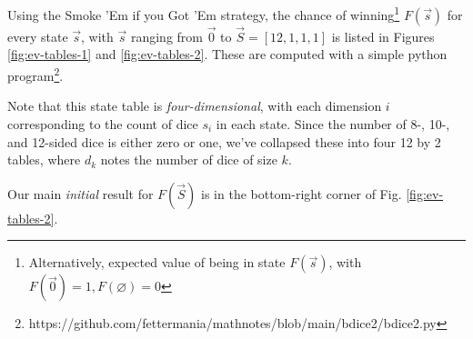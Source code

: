 \documentclass[11pt, oneside]{article} 	%
\begin{document}
Using the Smoke 'Em if you Got 'Em strategy, the chance of winning\footnote{Alternatively, expected value of being in state $F(\vec{s})$, with $F(\vec{0}) = 1, F(\varnothing) = 0$} $F(\vec{s})$ for every state $\vec{s}$, with $\vec{s}$ ranging from $\vec{0}$ to $\vec{S} = [12, 1, 1, 1]$ is listed in Figures \ref{fig:ev-tables-1} and \ref{fig:ev-tables-2}.  These are computed with a simple python program\footnote{https://github.com/fettermania/mathnotes/blob/main/bdice2/bdice2.py}.

Note that this state table is \textit{four-dimensional}, with each dimension $i$ corresponding to the count of dice $s_i$ in each state.  Since the number of 8-, 10-, and 12-sided dice is either zero or one, we've collapsed these into four 12 by 2 tables, where $d_k$ notes the number of dice of size $k$.  

Our main \textit{initial} result for $F(\vec{S})$ is in the bottom-right corner of Fig. \ref{fig:ev-tables-2}.
\end{document}
